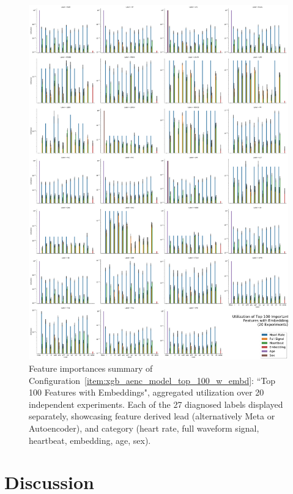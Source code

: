 \documentclass[\main/thesis.tex]{subfiles}
\begin{document}
\begin{figure}[t]
    \centering
    \includegraphics[width=\textwidth]{figure/utilization_top_100_feature_importances_all_w_embedding.pdf}
    \caption{Feature importances summary of Configuration~\ref{item:xgb_aenc_model_top_100_w_embd}: ``Top 100 Features with Embeddings", aggregated utilization over 20 independent experiments. Each of the 27 diagnosed labels displayed separately, showcasing feature derived lead (alternatively Meta or Autoencoder), and category (heart rate, full waveform signal, heartbeat, embedding, age, sex).}
    \label{fig:xgb_aenc_top_100_features_labelwise}
\end{figure}


\section{Discussion}
\end{document}
